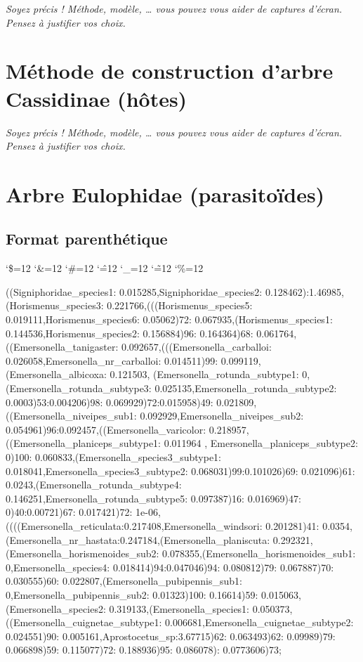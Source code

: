 \documentclass[a4paper, 12pt]{article}
\newenvironment{simplechar}{%
   \catcode`\$=12
   \catcode`\&=12
   \catcode`\#=12
   \catcode`\^=12
   \catcode`\_=12
   \catcode`\~=12
   \catcode`\%=12
}{}
\begin{document}
\textit{Soyez précis ! Méthode, modèle, … vous pouvez vous aider de captures d’écran. Pensez à justifier vos choix.}

\section{Méthode de construction d'arbre Cassidinae (hôtes)}

\emph{Soyez précis ! Méthode, modèle, … vous pouvez vous aider de captures d’écran. Pensez à justifier vos choix.}

\section{Arbre Eulophidae (parasitoïdes)}
\subsection{Format parenthétique} 
\begin{simplechar}
((Signiphoridae_species1: 0.015285,Signiphoridae_species2: 0.128462):1.46985,(Horismenus_species3: 0.221766,(((Horismenus_species5: 0.019111,Horismenus_species6: 0.05062)72: 0.067935,(Horismenus_species1: 0.144536,Horismenus_species2: 0.156884)96: 0.164364)68: 0.061764,((Emersonella_tanigaster: 0.092657,(((Emersonella_carballoi: 0.026058,Emersonella_nr_carballoi: 0.014511)99: 0.099119,  (Emersonella_albicoxa: 0.121503, (Emersonella_rotunda_subtype1: 0,(Emersonella_rotunda_subtype3: 0.025135,Emersonella_rotunda_subtype2: 0.0003)53:0.004206)98: 0.069929)72:0.015958)49: 0.021809,((Emersonella_niveipes_sub1: 0.092929,Emersonella_niveipes_sub2: 0.054961)96:0.092457,((Emersonella_varicolor: 0.218957, ((Emersonella_planiceps_subtype1: 0.011964 , Emersonella_planiceps_subtype2: 0)100: 0.060833,(Emersonella_species3_subtype1: 0.018041,Emersonella_species3_subtype2: 0.068031)99:0.101026)69: 0.021096)61: 0.0243,(Emersonella_rotunda_subtype4: 0.146251,Emersonella_rotunda_subtype5: 0.097387)16: 0.016969)47: 0)40:0.00721)67: 0.017421)72: 1e-06,((((Emersonella_reticulata:0.217408,Emersonella_windsori: 0.201281)41: 0.0354,(Emersonella_nr_hastata:0.247184,(Emersonella_planiscuta: 0.292321,(Emersonella_horismenoides_sub2: 0.078355,(Emersonella_horismenoides_sub1: 0,Emersonella_species4: 0.018414)94:0.047046)94: 0.080812)79: 0.067887)70: 0.030555)60: 0.022807,(Emersonella_pubipennis_sub1: 0,Emersonella_pubipennis_sub2: 0.01323)100: 0.16614)59: 0.015063,(Emersonella_species2: 0.319133,(Emersonella_species1: 0.050373,((Emersonella_cuignetae_subtype1: 0.006681,Emersonella_cuignetae_subtype2: 0.024551)90: 0.005161,Aprostocetus_sp:3.67715)62: 0.063493)62: 0.09989)79: 0.066898)59: 0.115077)72: 0.188936)95: 0.086078): 0.0773606)73;
\end{simplechar}
\end{document}
